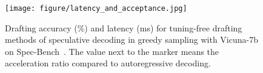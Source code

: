 \begin{figure}[t!]
\centering
\texttt{[image: figure/latency\_and\_acceptance.jpg]}
\vspace{-.8em}
\caption{\small Drafting accuracy (\%) and latency (ms) for tuning-free drafting methods of speculative decoding in greedy sampling with Vicuna-7b on Spec-Bench~\cite{Spec_Survey}. The value next to the marker means the acceleration ratio compared to autoregressive decoding.}
\label{fig:latency_and_acceptance}
\vspace{-2.0em}
\end{figure}
